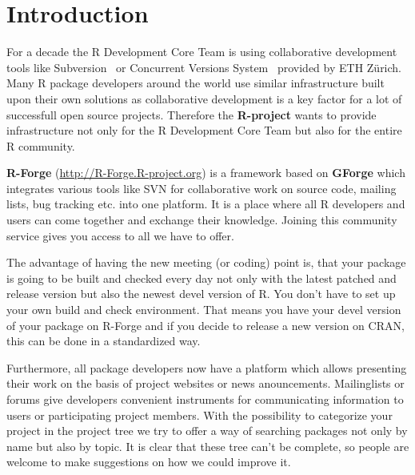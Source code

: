 \documentclass[a4paper]{report}
\newcommand{\proglang}[1]{\textsf{#1}}
\begin{document}
\newpage

\pagestyle{plain}
\tableofcontents

\clearpage
\pagestyle{headings}
\setcounter{page}{1}

\section{Introduction}
\label{sec:intro}

For a decade the \proglang{R} Development Core Team is using collaborative
development tools like Subversion~\citep[SVN,
see][]{forge:Pilato+Collins-Sussman+Fitzpatrick:2004} or Concurrent
Versions System~\citep[CVS, see][]{forge:Cederqvist:2006} provided by
ETH Z\"urich.   
Many \proglang{R} package
developers around the world use similar infrastructure built upon their own
solutions as collaborative development is a key factor for a lot of
successfull open source projects. Therefore the \textbf{R-project}
wants to provide infrastructure not only
for the \proglang{R} Development Core Team but also for the entire
\proglang{R} community. 

\textbf{R-Forge} (\url{http://R-Forge.R-project.org}) is a
framework based on 
\textbf{GForge} \citep{forge:copeland_et_al:2006} which integrates
various tools like 
SVN for collaborative work on source code, mailing lists, bug tracking
etc. into one platform. It is a
place where all \proglang{R} developers and users can come together and exchange
their knowledge. Joining this community service gives you access to
all we have to offer.

The advantage of having the new meeting (or coding) 
point is, that your package is going to be built and checked every day
not only with the latest patched and release version but also the
newest devel version of \proglang{R}. You don't have to set up your own
build and check environment. That means you have your devel version of
your package on R-Forge and if you decide to release a new
version on CRAN, this can be done in a standardized way.

Furthermore, all package developers now have a
platform which allows presenting their work on the basis of project
websites or
news anouncements. Mailinglists or forums give developers convenient
instruments for communicating information to users or participating
project members.
With the possibility to categorize your project in the project tree we
try to offer a way of searching packages not only by name but also by
topic. It is clear that these tree can't be complete, so people are
welcome to make suggestions on how we could improve it.
 
\end{document}
